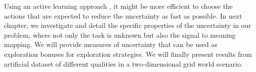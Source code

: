 Using an active learning approach \cite{settles2010active}, it might be more efficient to choose the actions that are expected to reduce the uncertainty as fast as possible. In next chapter, we investigate and detail the specific properties of the uncertainty in our problem, where not only the task is unknown but also the signal to meaning mapping. We will provide measures of uncertainty that can be used as exploration bonuses for exploration strategies. We will finally present results from artificial dataset of different qualities in a two-dimensional grid world scenario.










